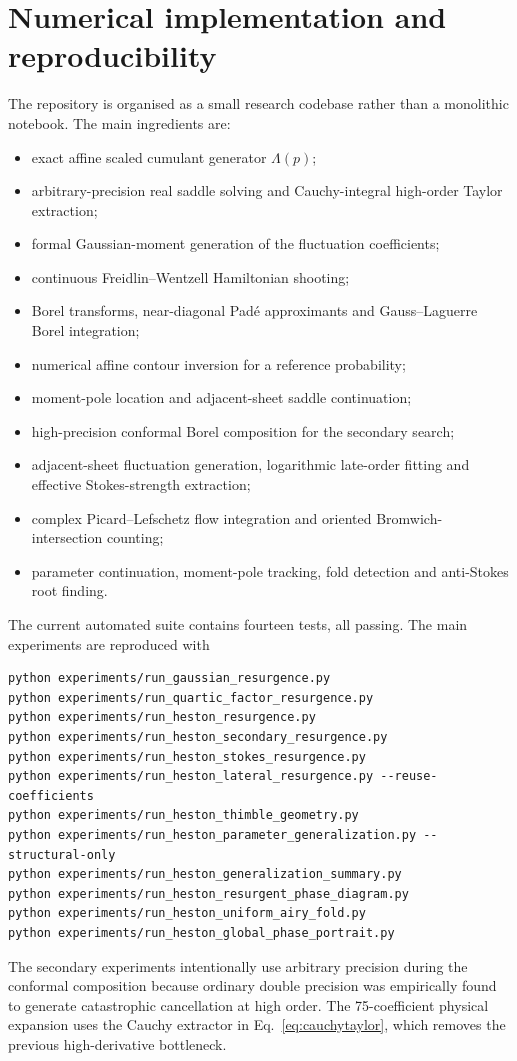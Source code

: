 \documentclass[11pt]{article}
\begin{document}
\section{Numerical implementation and reproducibility}\label{sec:repro}
The repository is organised as a small research codebase rather than a monolithic notebook. The main ingredients are:
\begin{itemize}
 \item exact affine scaled cumulant generator $\Lambda(p)$;
 \item arbitrary-precision real saddle solving and Cauchy-integral high-order Taylor extraction;
 \item formal Gaussian-moment generation of the fluctuation coefficients;
 \item continuous Freidlin--Wentzell Hamiltonian shooting;
 \item Borel transforms, near-diagonal Pad\'e approximants and Gauss--Laguerre Borel integration;
 \item numerical affine contour inversion for a reference probability;
 \item moment-pole location and adjacent-sheet saddle continuation;
 \item high-precision conformal Borel composition for the secondary search;
 \item adjacent-sheet fluctuation generation, logarithmic late-order fitting and effective Stokes-strength extraction;
 \item complex Picard--Lefschetz flow integration and oriented Bromwich-intersection counting;
 \item parameter continuation, moment-pole tracking, fold detection and anti-Stokes root finding.
\end{itemize}
The current automated suite contains fourteen tests, all passing. The main experiments are reproduced with
\begin{verbatim}
python experiments/run_gaussian_resurgence.py
python experiments/run_quartic_factor_resurgence.py
python experiments/run_heston_resurgence.py
python experiments/run_heston_secondary_resurgence.py
python experiments/run_heston_stokes_resurgence.py
python experiments/run_heston_lateral_resurgence.py --reuse-coefficients
python experiments/run_heston_thimble_geometry.py
python experiments/run_heston_parameter_generalization.py --structural-only
python experiments/run_heston_generalization_summary.py
python experiments/run_heston_resurgent_phase_diagram.py
python experiments/run_heston_uniform_airy_fold.py
python experiments/run_heston_global_phase_portrait.py
\end{verbatim}
The secondary experiments intentionally use arbitrary precision during the conformal composition because ordinary double precision was empirically found to generate catastrophic cancellation at high order. The 75-coefficient physical expansion uses the Cauchy extractor in Eq.~\eqref{eq:cauchytaylor}, which removes the previous high-derivative bottleneck.
\end{document}
